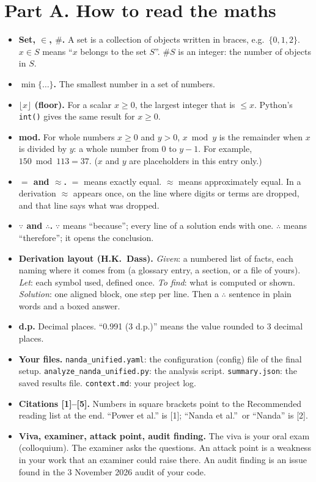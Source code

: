 \documentclass[11pt,a4paper,oneside,openany]{report}
\newcommand{\code}[1]{\texttt{#1}}
\newcommand{\gl}[1]{\textbf{#1}}   %
\newenvironment{glist}{\begin{itemize}\setlength{\itemsep}{2pt}\setlength{\parskip}{1pt}}{\end{itemize}}
\begin{document}
\section*{Part A. How to read the maths}

\begin{glist}
\item[\gl{A1}] \textbf{Set, $\in$, $\#$.} A set is a collection of objects written in braces, e.g.\ $\{0, 1, 2\}$. $x \in S$ means ``$x$ belongs to the set $S$''. $\#S$ is an integer: the number of objects in $S$.
\item[\gl{A2}] \textbf{$\min\{\ldots\}$.} The smallest number in a set of numbers.
\item[\gl{A3}] \textbf{$\lfloor x \rfloor$ (floor).} For a scalar $x \ge 0$, the largest integer that is $\le x$. Python's \code{int()} gives the same result for $x \ge 0$.
\item[\gl{A4}] \textbf{mod.} For whole numbers $x \ge 0$ and $y > 0$, $x \bmod y$ is the remainder when $x$ is divided by $y$: a whole number from $0$ to $y - 1$. For example, $150 \bmod 113 = 37$. ($x$ and $y$ are placeholders in this entry only.)
\item[\gl{A5}] \textbf{$=$ and $\approx$.} $=$ means exactly equal. $\approx$ means approximately equal. In a derivation $\approx$ appears once, on the line where digits or terms are dropped, and that line says what was dropped.
\item[\gl{A6}] \textbf{$\because$ and $\therefore$.} $\because$ means ``because''; every line of a solution ends with one. $\therefore$ means ``therefore''; it opens the conclusion.
\item[\gl{A7}] \textbf{Derivation layout (H.K.\ Dass).} \emph{Given}: a numbered list of facts, each naming where it comes from (a glossary entry, a section, or a file of yours). \emph{Let}: each symbol used, defined once. \emph{To find}: what is computed or shown. \emph{Solution}: one aligned block, one step per line. Then a $\therefore$ sentence in plain words and a boxed answer.
\item[\gl{A8}] \textbf{d.p.} Decimal places. ``0.991 (3 d.p.)'' means the value rounded to 3 decimal places.
\item[\gl{A9}] \textbf{Your files.} \code{nanda\_\allowbreak{}unified.yaml}: the configuration (config) file of the final setup. \code{analyze\_\allowbreak{}nanda\_\allowbreak{}unified.py}: the analysis script. \code{summary.json}: the saved results file. \code{context.md}: your project log.
\item[\gl{A10}] \textbf{Citations [1]--[5].} Numbers in square brackets point to the Recommended reading list at the end. ``Power et al.'' is [1]; ``Nanda et al.''\ or ``Nanda'' is [2].
\item[\gl{A11}] \textbf{Viva, examiner, attack point, audit finding.} The viva is your oral exam (colloquium). The examiner asks the questions. An attack point is a weakness in your work that an examiner could raise there. An audit finding is an issue found in the 3 November 2026 audit of your code.
\end{glist}
\end{document}
